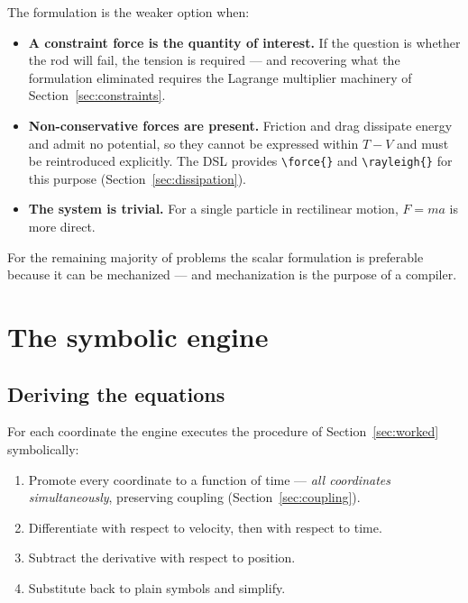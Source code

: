 \documentclass[11pt,a4paper]{article}
\newcommand{\code}[1]{\texttt{#1}}
\begin{document}
The formulation is the weaker option when:

\begin{itemize}[leftmargin=1.4em,itemsep=0.3em]
  \item \textbf{A constraint force is the quantity of interest.} If the question is whether the rod
        will fail, the tension is required --- and recovering what the formulation eliminated
        requires the Lagrange multiplier machinery of Section~\ref{sec:constraints}.
  \item \textbf{Non-conservative forces are present.} Friction and drag dissipate energy and admit no
        potential, so they cannot be expressed within $T - V$ and must be reintroduced explicitly.
        The DSL provides \code{\textbackslash force\{\}} and \code{\textbackslash rayleigh\{\}} for
        this purpose (Section~\ref{sec:dissipation}).
  \item \textbf{The system is trivial.} For a single particle in rectilinear motion, $F = ma$ is more
        direct.
\end{itemize}

For the remaining majority of problems the scalar formulation is preferable because it can be
mechanized --- and mechanization is the purpose of a compiler.

\section{The symbolic engine}
\label{sec:engine}

\subsection{Deriving the equations}

For each coordinate the engine executes the procedure of Section~\ref{sec:worked} symbolically:

\begin{enumerate}[leftmargin=1.8em,itemsep=0.2em]
  \item Promote every coordinate to a function of time --- \emph{all coordinates simultaneously},
        preserving coupling (Section~\ref{sec:coupling}).
  \item Differentiate with respect to velocity, then with respect to time.
  \item Subtract the derivative with respect to position.
  \item Substitute back to plain symbols and simplify.
\end{enumerate}
\end{document}

